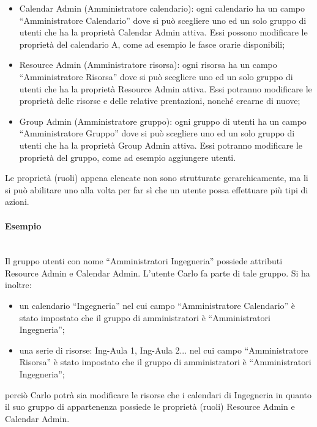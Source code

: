 \begin{itemize}
 \item Calendar Admin (Amministratore calendario): ogni calendario ha un campo
 ``Amministratore Calendario'' dove si può scegliere uno ed un solo gruppo di utenti
 che ha la proprietà Calendar Admin attiva. Essi possono modificare le proprietà
 del calendario A, come ad esempio le fasce orarie disponibili;
 
 \item Resource Admin (Amministratore risorsa): ogni risorsa ha un campo
 ``Amministratore Risorsa'' dove si può scegliere uno ed un solo gruppo di utenti
 che ha la proprietà Resource Admin attiva. Essi potranno modificare le proprietà
 delle risorse e delle relative prentazioni,
 nonché crearne di nuove;
 
 \item Group Admin (Amministratore gruppo): ogni gruppo di utenti ha un campo
 ``Amministratore Gruppo'' dove si può scegliere uno ed un solo gruppo di utenti
 che ha la proprietà Group Admin attiva. Essi potranno modificare le proprietà
 del gruppo, come ad esempio aggiungere utenti.
 
\end{itemize}
Le proprietà (ruoli) appena elencate non sono strutturate gerarchicamente,
ma li si può abilitare uno alla volta per far sì che un utente possa effettuare
più tipi di azioni.
\paragraph*{Esempio}\mbox{}\\ %
Il gruppo utenti con nome ``Amministratori Ingegneria'' possiede attributi Resource Admin e Calendar Admin.
L'utente Carlo fa parte di tale gruppo.
Si ha inoltre:
\begin{itemize}
 \item un calendario ``Ingegneria'' nel cui campo ``Amministratore Calendario''
 è stato impostato che il gruppo di amministratori è ``Amministratori Ingegneria'';
 \item una serie di risorse: Ing-Aula 1, Ing-Aula 2... nel cui campo
 ``Amministratore Risorsa'' è stato impostato che il gruppo di amministratori
 è ``Amministratori Ingegneria'';
\end{itemize}
perciò Carlo potrà sia modificare le risorse che i calendari di Ingegneria in quanto
il suo gruppo di appartenenza possiede le proprietà (ruoli) Resource Admin e Calendar Admin.

